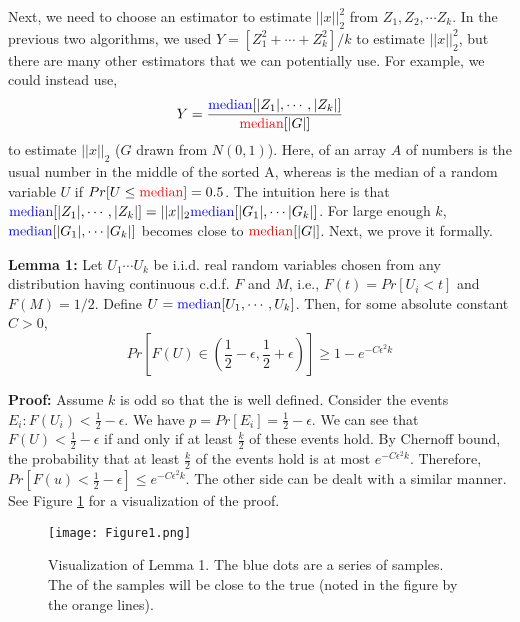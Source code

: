 \documentclass[11pt]{article}
\begin{document}
Next, we need to choose an estimator to estimate $||x||_2^2$ from $Z_1, Z_2, \cdots Z_k$. In the previous two algorithms, we used $Y=[Z_1^2 + \cdots +Z_k^2]/k$ to estimate $||x||_2^2$, but there are many other estimators that we can potentially use. For example, we could instead use,
\begin{equation*}
Y=\frac{{\color{blue} \text{median}}[ |Z_1|, \cdots , |Z_k| ]}{ {\color{red} \text{median}}[|G|] }
\end{equation*}
to estimate $||x||_2$ ($G$ drawn from $N(0,1)$). Here, {\color{blue} } of an array $A$ of numbers is the usual number in the middle of the sorted A, whereas {\color{red} } is the median of a random variable $U$ if $Pr[U\le {\color{red} \text{median}}]=0.5 $. The intuition here is that ${\color{blue} \text{median}}[ |Z_1|, \cdots , |Z_k| ] = ||x||_2 {\color{blue} \text{median}} [|G_1|, \cdots |G_k|]$. For large enough $k$, ${\color{blue} \text{median}} [|G_1|, \cdots |G_k|]$ becomes close to ${\color{red} \text{median}}[|G|]$. Next, we prove it formally.

\textbf{Lemma 1:}  Let $U_1 \cdots U_k$ be i.i.d. real random variables chosen from any distribution having continuous c.d.f. $F$ and {\color{red} } $M$, i.e., $F(t)=Pr[U_i <t]$ and $F(M)=1/2$. Define $U={\color{blue} \text{median}} [U_1,\cdots,U_k]$. Then, for some absolute constant $C>0$,
\begin{equation*}
Pr[F(U) \in (\frac{1}{2}-\epsilon,\frac{1}{2}+\epsilon)] \ge 1-e^{-C \epsilon^2 k} 
\end{equation*}

\textbf{Proof:} Assume $k$ is odd so that the {\color{blue} } is well defined. Consider the events $E_i: F(U_i) < \frac{1}{2} - \epsilon$. We have $p = Pr[E_i] = \frac{1}{2} - \epsilon$. We can see that $F(U) < \frac{1}{2} - \epsilon$ if and only if at least $\frac{k}{2}$ of these events hold. By Chernoff bound, the probability that at least $\frac{k}{2}$ of the events hold is at most $e^{-C \epsilon^2 k}$. Therefore, $Pr[F(u) < \frac{1}{2} - \epsilon] \le e^{-C \epsilon^2 k}$. The other side can be dealt with a similar manner. See Figure \ref{fig:fig1} for a visualization of the proof.

\begin{figure}[h]
\centering
\texttt{[image: Figure1.png]}
\caption{Visualization of Lemma 1. The blue dots are a series of samples. The {\color{blue} } of the samples will be close to the true {\color{red} } (noted in the figure by the orange lines).}
\label{fig:fig1}
\end{figure}
\end{document}
